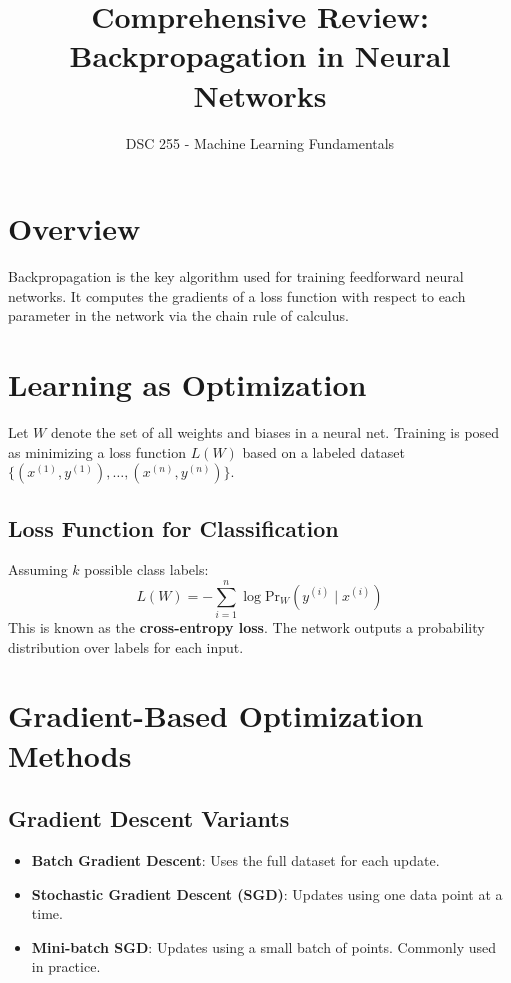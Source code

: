 \documentclass[11pt]{article}
\title{Comprehensive Review: Backpropagation in Neural Networks}
\author{DSC 255 - Machine Learning Fundamentals}
\date{}
\begin{document}
\maketitle
\tableofcontents
\newpage

\section{Overview}

Backpropagation is the key algorithm used for training feedforward neural networks. It computes the gradients of a loss function with respect to each parameter in the network via the chain rule of calculus.

\section{Learning as Optimization}

Let $W$ denote the set of all weights and biases in a neural net. Training is posed as minimizing a loss function $L(W)$ based on a labeled dataset $\{(x^{(1)}, y^{(1)}), \ldots, (x^{(n)}, y^{(n)})\}$.

\subsection*{Loss Function for Classification}

Assuming $k$ possible class labels:
\[
L(W) = -\sum_{i=1}^{n} \log \text{Pr}_W(y^{(i)} \mid x^{(i)})
\]
This is known as the \textbf{cross-entropy loss}. The network outputs a probability distribution over labels for each input.

\section{Gradient-Based Optimization Methods}

\subsection*{Gradient Descent Variants}
\begin{itemize}
    \item \textbf{Batch Gradient Descent}: Uses the full dataset for each update.
    \item \textbf{Stochastic Gradient Descent (SGD)}: Updates using one data point at a time.
    \item \textbf{Mini-batch SGD}: Updates using a small batch of points. Commonly used in practice.
\end{itemize}
\end{document}
